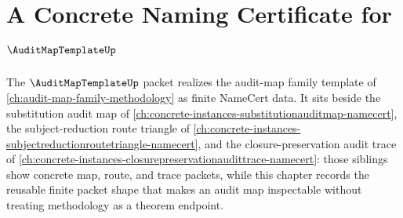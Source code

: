\chapter{A Concrete Naming Certificate for $\AuditMapTemplateUp$}
\label{ch:concrete-instances-auditmaptemplate-namecert}

The $\AuditMapTemplateUp$ packet realizes the audit-map family template of \autoref{ch:audit-map-family-methodology} as finite NameCert data. It sits beside the substitution audit map of \autoref{ch:concrete-instances-substitutionauditmap-namecert}, the subject-reduction route triangle of \autoref{ch:concrete-instances-subjectreductionroutetriangle-namecert}, and the closure-preservation audit trace of \autoref{ch:concrete-instances-closurepreservationaudittrace-namecert}: those siblings show concrete map, route, and trace packets, while this chapter records the reusable finite packet shape that makes an audit map inspectable without treating methodology as a theorem endpoint.

